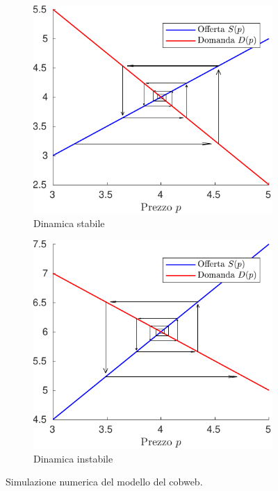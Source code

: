 \begin{figure}[bp]
\begin{subfigure}{0.45\textwidth}
	\centering
	\includegraphics[width=\textwidth]{cobweb1.pdf}
	\caption{Dinamica stabile}
	\label{fig:cobweb-stable}
\end{subfigure}%
\hspace{0.04\textwidth}%
\begin{subfigure}{0.45\textwidth}
	\centering
	\includegraphics[width=\textwidth]{cobweb2.pdf}
	\caption{Dinamica instabile}
	\label{fig:cobweb-unstable}
\end{subfigure}
\caption{Simulazione numerica del modello del cobweb.}
\label{fig:cobweb}
\end{figure}

